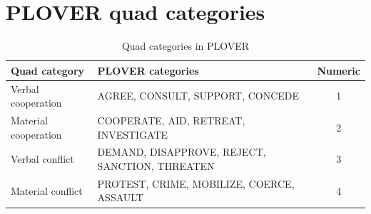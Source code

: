 \documentclass[11pt]{report}
\begin{document}
\section{PLOVER quad categories}

\begin{table}[htp]
\caption{Quad categories in PLOVER}
\begin{center}
\begin{tabular}{|l|l|c|}
\hline
Quad category & PLOVER categories & Numeric\\
\hline
Verbal cooperation & AGREE, CONSULT, SUPPORT, CONCEDE &  1 \\
Material cooperation & COOPERATE, AID, RETREAT, INVESTIGATE & 2 \\
Verbal conflict & DEMAND, DISAPPROVE, REJECT, SANCTION, THREATEN & 3\\
Material conflict & PROTEST, CRIME, MOBILIZE, COERCE, ASSAULT & 4\\
\hline

\end{tabular}
\end{center}
\label{default}
\end{table}



\end{document}
